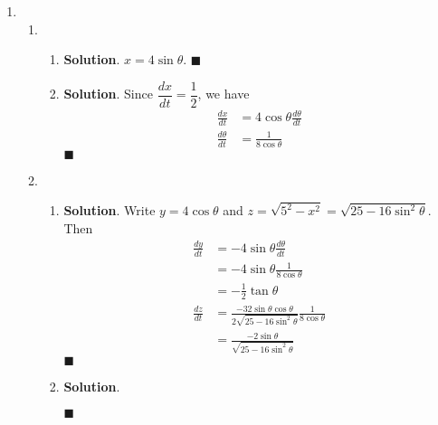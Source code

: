 \documentclass[12pt]{article}
\newenvironment*{sol}{\par \textbf{Solution}.}{\hfill$\blacksquare$}
\begin{document}
\begin{enumerate}
\begin{sol}
            Then the equation of tangent to $C$ at $(-7,-1)$ is \begin{align*}
                y+1&=-\frac{1}{6}(x+7)\\
                x+6y+13&=0
            \end{align*}
        \end{sol}
        \item \begin{enumerate}
            \item \begin{enumerate}
                \item \begin{sol}
                    $x=4\sin{\theta}$.
                \end{sol}
                \item \begin{sol}
                    Since $\dfrac{dx}{dt}=\dfrac{1}{2}$, we have \begin{align*}
                        \frac{dx}{dt}&=4\cos{\theta}\frac{d\theta}{dt}\\
                        \frac{d\theta}{dt}&=\frac{1}{8\cos{\theta}}
                    \end{align*}
                \end{sol}
            \end{enumerate}
            \item \begin{enumerate}
                \item \begin{sol}
                    Write $y=4\cos{\theta}$ and $z=\sqrt{5^2-x^2}=\sqrt{25-16\sin^2{\theta}}$. Then \begin{align*}
                        \frac{dy}{dt}&=-4\sin{\theta}\frac{d\theta}{dt}\\
                        &=-4\sin{\theta}\frac{1}{8\cos{\theta}}\\
                        &=-\frac{1}{2}\tan{\theta}\\
                        \frac{dz}{dt}&=\frac{-32\sin{\theta}\cos{\theta}}{2\sqrt{25-16\sin^2{\theta}}}\frac{1}{8\cos{\theta}}\\
                        &=\frac{-2\sin{\theta}}{\sqrt{25-16\sin^2{\theta}}}
                    \end{align*}
                \end{sol}
                \item \begin{sol}

\end{sol}
\end{enumerate}
\end{enumerate}
\end{enumerate}
\end{document}
